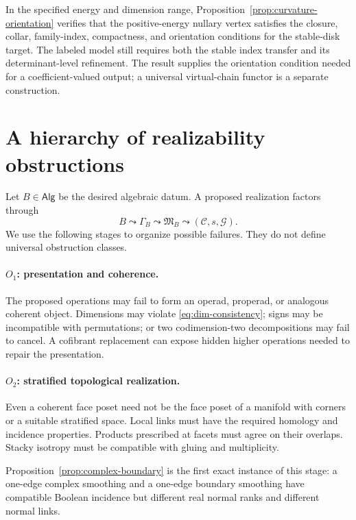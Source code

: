 \documentclass[11pt,letterpaper,twoside]{article}
\theoremstyle{plain}
\theoremstyle{definition}
\theoremstyle{remark}
\newcommand{\Alg}{\mathsf{Alg}}
\begin{document}
In the specified energy and dimension range, Proposition~\ref{prop:curvature-orientation} verifies that the positive-energy nullary vertex satisfies the closure, collar, family-index, compactness, and orientation conditions for the stable-disk target.  The labeled model still requires both the stable index transfer and its determinant-level refinement.  The result supplies the orientation condition needed for a coefficient-valued output; a universal virtual-chain functor is a separate construction.

\section{A hierarchy of realizability obstructions}\label{sec:obstructions}

Let \(B\in\Alg\) be the desired algebraic datum.  A proposed realization factors through
\begin{equation}\label{eq:lifting-chain}
 B \leadsto \Gamma_B \leadsto \mathfrak M_B \leadsto (\mathcal C,s,\mathcal G).
\end{equation}
We use the following stages to organize possible failures.  They do not define universal obstruction classes.

\paragraph{\(O_1\): presentation and coherence.}
The proposed operations may fail to form an operad, properad, or analogous coherent object.  Dimensions may violate \eqref{eq:dim-consistency}; signs may be incompatible with permutations; or two codimension-two decompositions may fail to cancel.  A cofibrant replacement can expose hidden higher operations needed to repair the presentation.

\paragraph{\(O_2\): stratified topological realization.}
Even a coherent face poset need not be the face poset of a manifold with corners or a suitable stratified space.  Local links must have the required homology and incidence properties.  Products prescribed at facets must agree on their overlaps.  Stacky isotropy must be compatible with gluing and multiplicity.

Proposition~\ref{prop:complex-boundary} is the first exact instance of this stage: a one-edge complex smoothing and a one-edge boundary smoothing have compatible Boolean incidence but different real normal ranks and different normal links.
\end{document}
